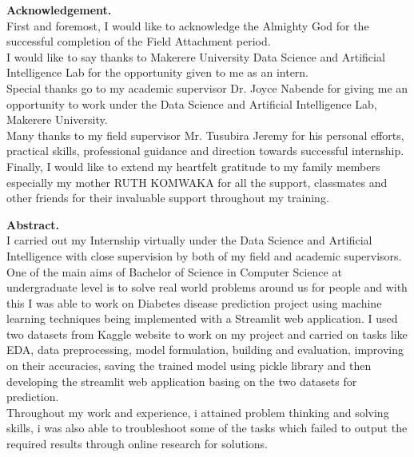 \documentclass[11pt]{article}
\begin{document}
\newpage

	\textbf{Acknowledgement.}\\
	First and foremost, I would like to acknowledge the Almighty God for the successful completion
	of the Field Attachment period.\\
	
	I would like to say thanks to Makerere University Data Science and Artificial Intelligence Lab for the opportunity given to me as
	an intern.\\
	
	Special thanks go to my academic supervisor Dr. Joyce Nabende for giving me an opportunity to work under the Data Science and Artificial Intelligence Lab, Makerere University.\\
	
	Many thanks to my field supervisor Mr. Tusubira Jeremy for his personal
	efforts, practical skills, professional guidance and direction towards successful internship.\\
	
	Finally, I would like to extend my heartfelt gratitude to my family members especially my mother
	RUTH KOMWAKA for all the support, classmates and other friends for their invaluable support
	throughout my training.\\
	\thispagestyle{empty}


\newpage

	\textbf{Abstract.}\\
	I carried out my Internship virtually under the Data Science and Artificial Intelligence with close supervision by both of my field and academic supervisors.\\
	
	One of the main aims of Bachelor of Science in Computer Science at undergraduate level is to solve real world problems around us for people and with this I was able to work on Diabetes disease prediction project using machine learning techniques being implemented with a Streamlit web application. I used two datasets from Kaggle website to work on my project and carried on tasks like EDA, data preprocessing, model formulation, building and evaluation, improving on their accuracies, saving the trained model using pickle library and then developing the streamlit web application basing on the two datasets for prediction.\\
	
	Throughout my work and experience, i attained problem thinking and solving skills, i was also able to troubleshoot some of the tasks which failed to output the required results through online research for solutions.\\
	
\end{document}
